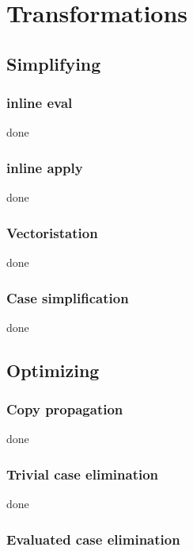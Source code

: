 \documentclass{book}
\begin{document}
\chapter{Transformations} %

\section{Simplifying}

\subsection{inline eval}

done

\subsection{inline apply}

done

\subsection{Vectoristation}

done

\subsection{Case simplification}

done

\section{Optimizing}

\subsection{Copy propagation}

done

\subsection{Trivial case elimination}

done

\subsection{Evaluated case elimination}
\end{document}
